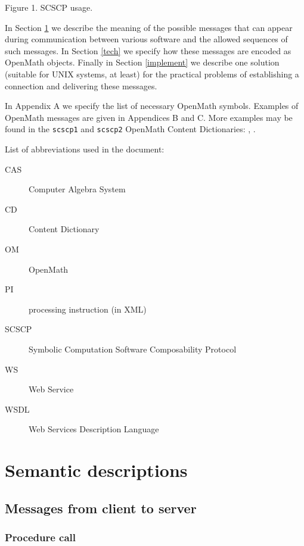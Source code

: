 \documentclass{amsart}
\begin{document}
\centerline{\small{Figure 1. SCSCP usage.}}
\vspace{15pt}

In Section \ref{semantic} we describe the meaning of the possible messages
that can appear during communication between various software and the
allowed sequences of such messages. In Section \ref{tech} we
specify how these messages are encoded as OpenMath objects. 
Finally in Section \ref{implement} we describe one
solution (suitable for UNIX systems, at least) for the practical
problems of establishing a connection and delivering these messages.

In Appendix A we specify the list of necessary OpenMath symbols.
Examples of OpenMath messages are given in Appendices B and C.  
More examples may be found in the {\tt scscp1} and {\tt scscp2} OpenMath 
Content Dictionaries: \cite{scscp1}, \cite{scscp2}.
\vspace{5pt}

List of abbreviations used in the document:
\begin{description}
\item[CAS] Computer Algebra System
\item[CD] Content Dictionary 
\item[OM] OpenMath 
\item[PI] processing instruction (in XML)
\item[SCSCP] Symbolic Computation Software Composability Protocol 
\item[WS] Web Service 
\item[WSDL] Web Services Description Language 
\end{description}


\section{Semantic descriptions}\label{semantic}
 
\subsection{Messages from client to server}

\subsubsection{Procedure call}\label{sec_semantic_msgs_procedurecall}
\end{document}
